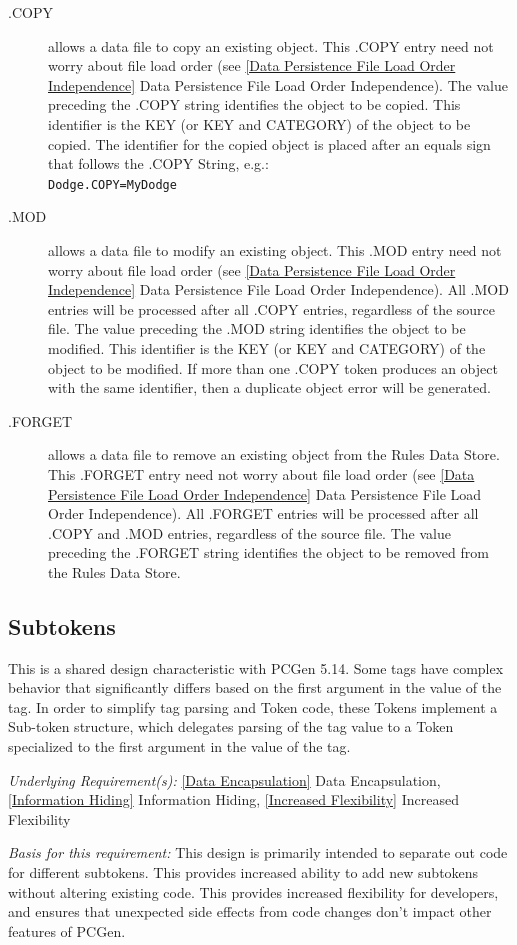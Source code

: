 \documentclass[12pt,letterpaper]{article}
\newcommand{\textem}[1]{\emph{#1}}
\newcommand{\lsubsection}[1]{\label{#1}\subsection{#1}}
\newcommand{\myref}[1]{\ref{#1} #1}
\newcommand{\basis}{\noindent\textem{Basis for this requirement:} }
\newcommand{\under}{\noindent\textem{Underlying Requirement(s):} }
\begin{document}
\begin{description}
\item[.COPY] allows a data file to copy an existing object. This .COPY entry need not worry about
file load order (see \myref{Data Persistence File Load Order Independence}).  The value preceding
the .COPY string identifies the object to be copied.  This identifier is the KEY
(or KEY and CATEGORY) of the object to be copied.  The identifier for the copied object is placed 
after an equals sign that follows the .COPY String, e.g.:\\
\texttt{Dodge.COPY=MyDodge}
\item[.MOD] allows a data file to modify an existing object.  This .MOD entry need not worry about
file load order (see \myref{Data Persistence File Load Order Independence}).  All .MOD entries will
be processed after all .COPY entries, regardless of the source file.  The value preceding
the .MOD string identifies the object to be modified.  This identifier is the KEY
(or KEY and CATEGORY) of the object to be modified.  If more than one .COPY token produces an 
object with the same identifier, then a duplicate object error will be generated.
\item[.FORGET] allows a data file to remove an existing object from the Rules Data Store.  This 
.FORGET entry need not worry about file load order
(see \myref{Data Persistence File Load Order Independence}).  All .FORGET entries will
be processed after all .COPY and .MOD entries, regardless of the source file.  The value preceding
the .FORGET string identifies the object to be removed from the Rules Data Store.  
\end{description}

\lsubsection{Subtokens}

This is a shared design characteristic with PCGen 5.14.  Some tags have complex behavior
that significantly differs based on the first argument in the value of the tag.  In order
to simplify tag parsing and Token code, these Tokens implement a Sub-token structure, 
which delegates parsing of the tag value to a Token specialized to the first argument
in the value of the tag.

\under \myref{Data Encapsulation}, \myref{Information Hiding}, \myref{Increased Flexibility}

\basis This design is primarily intended to separate out code for different subtokens.  This
provides increased ability to add new subtokens without altering existing code.  This provides
increased flexibility for developers, and ensures that unexpected side effects from code changes
don't impact other features of PCGen.
\end{document}
